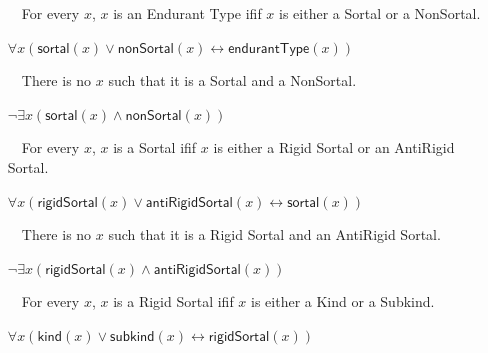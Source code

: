 \documentclass{article}
\newcommand{\AxLabel}{a}
\newcounter{cntax}
\newcommand{\myax}[1]{\refstepcounter{cntax}{\bf \small \AxLabel\thecntax}\label{#1}$\,\,\,\,$}
\newcommand{\me}[1]{\textsf{#1}}
\begin{document}
\begin{itemize}
    \item[\myax{ax_endurantType_taxonomy_properties}] For every $x$, $x$ is an \me{Endurant Type} ifif $x$ is either a \me{Sortal} or a \me{NonSortal}.
    
    $\forall x(\textsf{sortal}(x)\vee \textsf{nonSortal}(x)\leftrightarrow \textsf{endurantType}(x))$
    
    
    
    \item[\myax{ax_endurantType_partition_properties}] There is no $x$ such that it is a \me{Sortal} and a \me{NonSortal}.
    
    $\neg \exists x(\textsf{sortal}(x)\wedge \textsf{nonSortal}(x))$
    
    

    \item[\myax{ax_sortal_taxonomy}] For every $x$, $x$ is a \me{Sortal} ifif $x$ is either a \me{Rigid Sortal} or an \me{AntiRigid Sortal}.
    
    $\forall x(\textsf{rigidSortal}(x)\vee \textsf{antiRigidSortal}(x)\leftrightarrow \textsf{sortal}(x))$
    
    
    
    \item[\myax{ax_sortal_partition}] There is no $x$ such that it is a \me{Rigid Sortal} and an \me{AntiRigid Sortal}.
    
    $\neg \exists x(\textsf{rigidSortal}(x)\wedge \textsf{antiRigidSortal}(x))$
    
    

    \item[\myax{ax_rigidSortal_taxonomy}] For every $x$, $x$ is a \me{Rigid Sortal} ifif $x$ is either a \me{Kind} or a \me{Subkind}.
    
    $\forall x(\textsf{kind}(x)\vee \textsf{subkind}(x)\leftrightarrow \textsf{rigidSortal}(x))$
    
    
    

\end{itemize}
\end{document}
